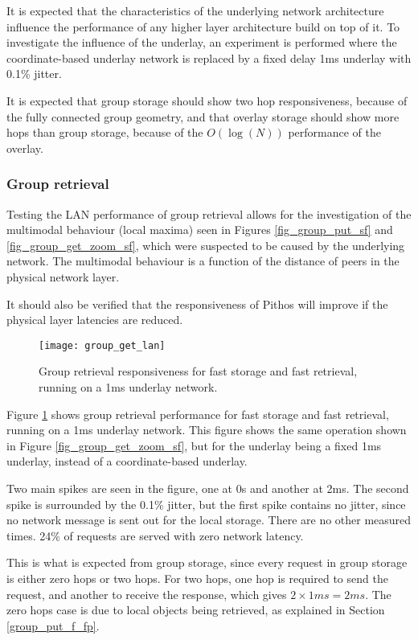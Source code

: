 It is expected that the characteristics of the underlying network architecture influence the performance of any higher layer architecture build on top of it. To investigate the influence of the underlay, an experiment is performed where the coordinate-based underlay network is replaced by a fixed delay 1ms underlay with 0.1\% jitter.

It is expected that group storage should show two hop responsiveness, because of the fully connected group geometry, and that overlay storage should show more hops than group storage, because of the $O(\log(N))$ performance of the overlay.

\subsubsection{Group retrieval}

Testing the LAN performance of group retrieval allows for the investigation of the multimodal behaviour (local maxima) seen in Figures \ref{fig_group_put_sf} and \ref{fig_group_get_zoom_sf}, which were suspected to be caused by the underlying network. The multimodal behaviour is a function of the distance of peers in the physical network layer.

It should also be verified that the responsiveness of Pithos will improve if the physical layer latencies are reduced.

\begin{figure}[htbp]
 \centering
 \texttt{[image: group\_get\_lan]}
 \caption{Group retrieval responsiveness for fast storage and fast retrieval, running on a 1ms underlay network.}
 \label{fig_group_get_lan}
\end{figure}
%
Figure \ref{fig_group_get_lan} shows group retrieval performance for fast storage and fast retrieval, running on a 1ms underlay network. This figure shows the same operation shown in Figure \ref{fig_group_get_zoom_sf}, but for the underlay being a fixed 1ms underlay, instead of a coordinate-based underlay.

Two main spikes are seen in the figure, one at 0s and another at 2ms. The second spike is surrounded by the 0.1\% jitter, but the first spike contains no jitter, since no network message is sent out for the local storage. There are no other measured times. 24\% of requests are served with zero network latency.

This is what is expected from group storage, since every request in group storage is either zero hops or two hops. For two hops, one hop is required to send the request, and another to receive the response, which gives $2\times 1 ms = 2 ms$. The zero hops case is due to local objects being retrieved, as explained in Section \ref{group_put_f_fp}.

